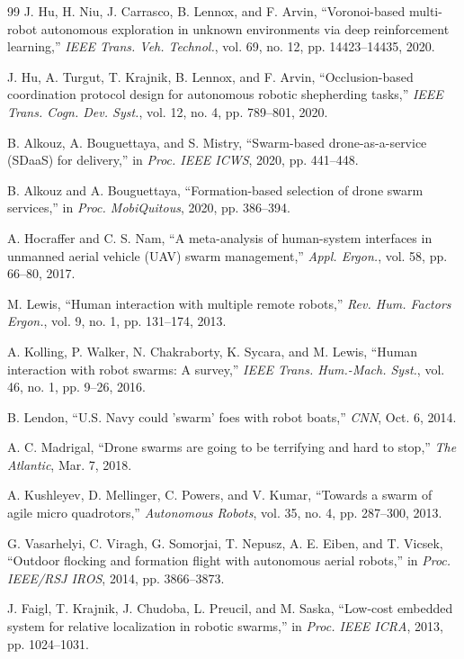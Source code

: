 \documentclass[letterpaper, 10pt, conference]{IEEEtran}
\begin{document}
\begin{thebibliography}{99}
J. Hu, H. Niu, J. Carrasco, B. Lennox, and F. Arvin, ``Voronoi-based multi-robot autonomous exploration in unknown environments via deep reinforcement learning,'' \emph{IEEE Trans. Veh. Technol.}, vol. 69, no. 12, pp. 14423--14435, 2020.

J. Hu, A. Turgut, T. Krajnik, B. Lennox, and F. Arvin, ``Occlusion-based coordination protocol design for autonomous robotic shepherding tasks,'' \emph{IEEE Trans. Cogn. Dev. Syst.}, vol. 12, no. 4, pp. 789--801, 2020.

B. Alkouz, A. Bouguettaya, and S. Mistry, ``Swarm-based drone-as-a-service ({SDaaS}) for delivery,'' in \emph{Proc. IEEE ICWS}, 2020, pp. 441--448.

B. Alkouz and A. Bouguettaya, ``Formation-based selection of drone swarm services,'' in \emph{Proc. MobiQuitous}, 2020, pp. 386--394.

A. Hocraffer and C. S. Nam, ``A meta-analysis of human-system interfaces in unmanned aerial vehicle ({UAV}) swarm management,'' \emph{Appl. Ergon.}, vol. 58, pp. 66--80, 2017.

M. Lewis, ``Human interaction with multiple remote robots,'' \emph{Rev. Hum. Factors Ergon.}, vol. 9, no. 1, pp. 131--174, 2013.

A. Kolling, P. Walker, N. Chakraborty, K. Sycara, and M. Lewis, ``Human interaction with robot swarms: A survey,'' \emph{IEEE Trans. Hum.-Mach. Syst.}, vol. 46, no. 1, pp. 9--26, 2016.

B. Lendon, ``{U.S.} Navy could 'swarm' foes with robot boats,'' \emph{CNN}, Oct. 6, 2014.

A. C. Madrigal, ``Drone swarms are going to be terrifying and hard to stop,'' \emph{The Atlantic}, Mar. 7, 2018.

A. Kushleyev, D. Mellinger, C. Powers, and V. Kumar, ``Towards a swarm of agile micro quadrotors,'' \emph{Autonomous Robots}, vol. 35, no. 4, pp. 287--300, 2013.

G. Vasarhelyi, C. Viragh, G. Somorjai, T. Nepusz, A. E. Eiben, and T. Vicsek, ``Outdoor flocking and formation flight with autonomous aerial robots,'' in \emph{Proc. IEEE/RSJ IROS}, 2014, pp. 3866--3873.

J. Faigl, T. Krajnik, J. Chudoba, L. Preucil, and M. Saska, ``Low-cost embedded system for relative localization in robotic swarms,'' in \emph{Proc. IEEE ICRA}, 2013, pp. 1024--1031.


\end{thebibliography}
\end{document}

